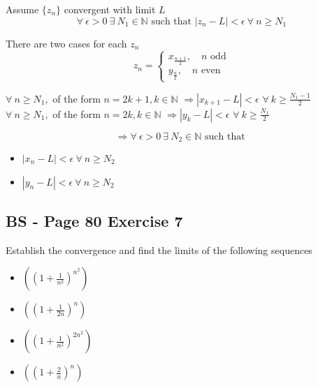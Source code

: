 \documentclass{article}
\begin{document}
Assume \(\{z_n\}\) convergent with limit \(L\)
\[
\forall \ \epsilon >0 \ \exists \ N_1 \in \mathbb{N} \text{ such that } |z_n - L| < \epsilon  \ \forall \ n \geq N_1
\]

There are two cases for each \(z_n\)
\[
z_n = \begin{cases}
    x_{\frac{n+1}{2}}, \quad n \text{ odd} \\
    y_{\frac{n}{2}}, \quad n \text{ even}
\end{cases}
\]


\(\forall \ n \geq N_1,\) of the form \(n = 2k + 1, k \in \mathbb{N}\) \(\Rightarrow |x_{k+1} - L| < \epsilon \) 
\(\forall \ k \geq \frac{N_1 - 1}{2}\)
\\

\(\forall \ n \geq N_1,\) of the form \(n = 2k, k \in \mathbb{N}\) \(\Rightarrow |y_k - L| < \epsilon \) 
\(\forall \ k \geq \frac{N_1}{2}\)


\[
\Rightarrow \forall \ \epsilon >0 \ \exists \ N_2 \in \mathbb{N} \text{ such that }
\]
\begin{itemize}
    \item \(|x_n - L| < \epsilon  \ \forall \ n \geq N_2\)
    \item \(|y_n - L| < \epsilon  \ \forall \ n \geq N_2\)
\end{itemize}


\subsection*{BS - Page 80 Exercise 7}
Establish the convergence and find the limits of the following sequences
\begin{itemize}
    \item \(\left(\left(1+ \frac{1}{n^2}\right)^{n^2}\right)\)
    \item \(\left(\left(1+ \frac{1}{2n}\right)^{n}\right)\)
    \item \(\left(\left(1+ \frac{1}{n^2}\right)^{2n^2}\right)\)
    \item \(\left(\left(1+ \frac{2}{n}\right)^{n}\right)\)
\end{itemize}
\end{document}
